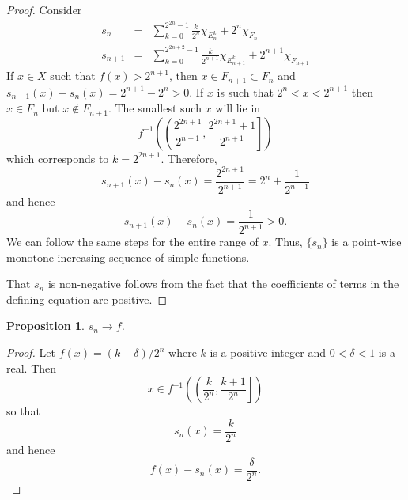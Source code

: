 \documentclass{article}
\theoremstyle{plain}
\numberwithin{thm}{section}
\theoremstyle{plain}
\newtheorem{prop}{Proposition}
\numberwithin{prop}{section}
\theoremstyle{definition}
\numberwithin{defn}{section}
\theoremstyle{remark}
\numberwithin{equation}{section}
\begin{document}
\begin{proof}
Consider
\begin{eqnarray*}
s_n &=& \sum_{k=0}^{2^{2n}-1}\frac{k}{2^n}\chi_{E_n^k} + 2^n\chi_{F_n} \\
s_{n+1} &=& \sum_{k=0}^{2^{2n+2}-1}\frac{k}{2^{n+1}}\chi_{E_{n+1}^k} + 2^{n+1}\chi_{F_{n+1}}
\end{eqnarray*}
If $x \in X$ such that $f(x) > 2^{n+1}$, then $x \in F_{n+1} \subset F_n$ and 
$s_{n+1}(x) - s_n(x) = 2^{n+1} - 2^n > 0$.
If $x$ is such that $2^n < x < 2^{n+1}$ then $x \in F_n$ but $x \notin F_{n+1}$.
The smallest such $x$ will lie in
\[
f^{-1}\left(\left(\frac{2^{2n+1}}{2^{n+1}}, \frac{2^{2n+1} + 1}{2^{n+1}}\right]\right)
\]
which corresponds to $k = 2^{2n+1}$. Therefore,
\[
s_{n+1}(x) - s_n(x) = \frac{2^{2n+1}}{2^{n+1}} = 2^n + \frac{1}{2^{n+1}}
\]
and hence
\[
s_{n+1}(x) - s_n(x) = \frac{1}{2^{n+1}} > 0.
\]
We can follow the same steps for the entire range of $x$. Thus, $\{s_n\}$ is a
point-wise monotone increasing sequence of simple functions.

That $s_n$ is non-negative follows from the fact that the coefficients of terms
in the defining equation are positive.
\end{proof}

\begin{prop}\label{s3p7}
$s_n \rightarrow f$.
\end{prop}
\begin{proof}
Let $f(x) = (k + \delta)/2^n$ where $k$ is a positive integer and $0 < \delta < 1$
is a real. Then 
\[
x \in f^{-1}\left(\left(\frac{k}{2^n}, \frac{k+1}{2^n}\right]\right)
\]
so that
\[
s_n(x) = \frac{k}{2^n}
\]
and hence
\[
f(x) - s_n(x) = \frac{\delta}{2^n}.
\]
\end{proof}
\end{document}
